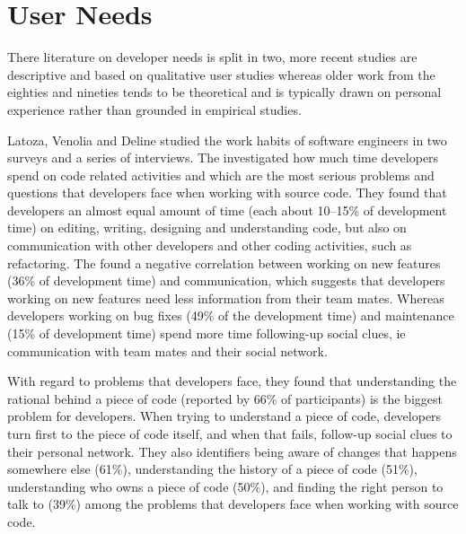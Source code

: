 \section{User Needs}

There literature on developer needs is split in two, more recent studies are descriptive and based on qualitative user studies whereas older work from the eighties and nineties tends to be theoretical and is typically drawn on personal experience rather than grounded in empirical studies. 


Latoza, Venolia and Deline \cite{Lato06a} studied the work habits of software engineers in two surveys and a series of interviews. The investigated how much time developers spend on code related activities and which are the most serious problems and questions that developers face when working with source code. They found that developers an almost equal amount of time (\ie each about 10--15\% of development time) on editing, writing, designing and understanding code, but also on communication with other developers and other coding activities, such as refactoring. The found a negative correlation between working on new features (36\% of development time) and communication, which suggests that developers working on new features need less information from their team mates. Whereas developers working on bug fixes (49\% of the development time) and maintenance (15\% of development time) spend more time following-up social clues, ie communication with team mates and their social network. 

With regard to problems that developers face, they found that understanding the rational behind a piece of code (reported by 66\% of participants) is the biggest problem for developers. When trying to understand a piece of code, developers turn first to the piece of code itself, and when that fails, follow-up social clues to their personal network. They also identifiers being aware of changes that happens somewhere else (61\%), understanding the history of a piece of code (51\%), understanding who owns a piece of code (50\%), and finding the right person to talk to (39\%) among the problems that developers face when working with source code.

